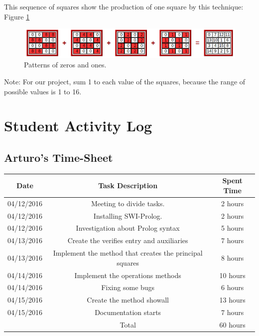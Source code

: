 \documentclass[12pt]{article}
\begin{document}
This sequence of squares show the production of one square by this technique: Figure \ref{multiplied}

\begin{figure}[h!]
 	\centering
  	\includegraphics[scale=0.4]
  	{Images/multiplied.png}
  	\caption{Patterns of zeros and ones.}
 \label{multiplied}
\end{figure}

Note: For our project, sum 1 to each value of the squares, because the range of possible values is 1 to 16.

\section{Student Activity Log}
\subsection{Arturo's Time-Sheet}
\begin{center}
\begin{tabular}{ |c|c|c| } 
 \hline
 Date & Task Description & Spent Time \\ 
 \hline\hline
 04/12/2016 & Meeting to divide tasks. & 2 hours\\
 04/12/2016 & Installing SWI-Prolog. & 2 hours\\
 04/12/2016 & Investigation about Prolog syntax & 5 hours\\
 04/13/2016 & Create the verifies entry and auxiliaries & 7 hours\\
 04/13/2016 & Implement the method that creates the principal squares & 8 hours\\
 04/14/2016 & Implement the operations methods & 10 hours\\
 04/14/2016 & Fixing some bugs & 6 hours\\
 04/15/2016 & Create the method showall & 13 hours\\
 04/15/2016 & Documentation starts & 7 hours\\
 \hline
 & Total & 60 hours\\ 
 \hline
\end{tabular}
\end{center}
\end{document}
